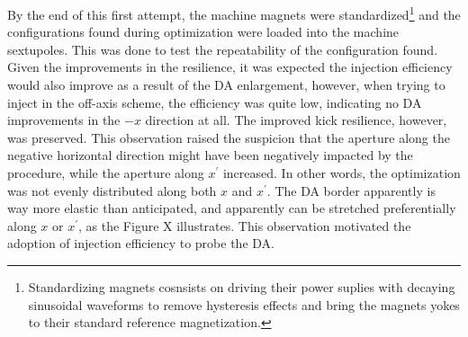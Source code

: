 By the end of this first attempt, the machine magnets were standardized\footnote{Standardizing magnets cosnsists on driving their power suplies with decaying sinusoidal waveforms to remove hysteresis effects and bring the magnets yokes to their standard reference magnetization.} and the configurations found during optimization were loaded into the machine sextupoles. This was done to test the repeatability of the configuration found. Given the improvements in the resilience, it was expected the injection efficiency would also improve as a result of the DA enlargement, however, when trying to inject in the off-axis scheme, the efficiency was quite low, indicating no DA improvements in the $-x$ direction at all. The improved kick resilience, however, was preserved. This observation raised the suspicion that the aperture along the negative horizontal direction might have been negatively impacted by the procedure, while the aperture along $x^\prime$ increased. In other words, the optimization was not evenly distributed along both $x$ and $x^\prime$. The DA border apparently is way more elastic than anticipated, and apparently can be stretched preferentially along $x$ or $x^\prime$, as the Figure X illustrates. This observation motivated the adoption of injection efficiency to probe the DA.

